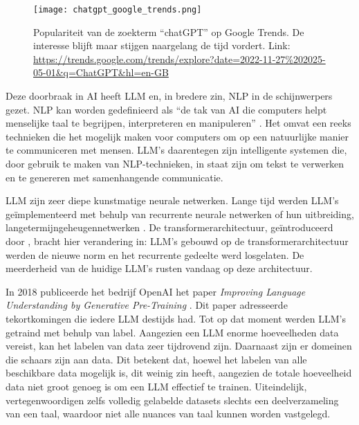 \begin{figure}
    \centering
    \texttt{[image: chatgpt\_google\_trends.png]}
    \caption[Populariteit van de zoekterm ``chatGPT'']{\label{fig:chatgpt_google_trends}Populariteit van de zoekterm ``chatGPT'' op Google Trends. De interesse blijft maar stijgen naargelang de tijd vordert. Link: \url{https://trends.google.com/trends/explore?date=2022-11-27\%202025-05-01\&q=ChatGPT\&hl=en-GB}}
\end{figure}

Deze doorbraak in \acrlong{AI} heeft \acrfull{LLM} en, in bredere zin, \acrfull{NLP} in de schijnwerpers gezet. \acrshort{NLP} kan worden gedefinieerd als ``de tak van \acrlong{AI} die computers helpt menselijke taal te begrijpen, interpreteren en manipuleren'' \autocite{Zohuri2022}. Het omvat een reeks technieken die het mogelijk maken voor computers om op een natuurlijke manier te communiceren met mensen. \acrshort{LLM}'s daarentegen zijn intelligente systemen die, door gebruik te maken van \acrshort{NLP}-technieken, in staat zijn om tekst te verwerken en te genereren met samenhangende communicatie. 

\acrlong{LLM} zijn zeer diepe kunstmatige neurale netwerken. Lange tijd werden \acrshort{LLM}'s geïmplementeerd met behulp van recurrente neurale netwerken of hun uitbreiding, langetermijngeheugennetwerken \autocite{Delobelle2020}. De transformerarchitectuur, geïntroduceerd door \textcite{Vaswani2017}, bracht hier verandering in: \acrshort{LLM}'s gebouwd op de transformerarchitectuur werden de nieuwe norm en het recurrente gedeelte werd losgelaten. De meerderheid van de huidige \acrshort{LLM}'s rusten vandaag op deze architectuur.

In 2018 publiceerde het bedrijf OpenAI het paper \emph{Improving Language Understanding by Generative Pre-Training} \autocite{Radford2018}. Dit paper adresseerde tekortkomingen die iedere \acrshort{LLM} destijds had. Tot op dat moment werden \acrshort{LLM}'s getraind met behulp van \gls{label}. Aangezien een \acrshort{LLM} enorme hoeveelheden data vereist, kan het labelen van data zeer tijdrovend zijn. Daarnaast zijn er domeinen die schaars zijn aan data. Dit betekent dat, hoewel het labelen van alle beschikbare data mogelijk is, dit weinig zin heeft, aangezien de totale hoeveelheid data niet groot genoeg is om een \acrshort{LLM} effectief te trainen. Uiteindelijk, vertegenwoordigen zelfs volledig gelabelde datasets slechts een deelverzameling van een taal, waardoor niet alle nuances van taal kunnen worden vastgelegd.

